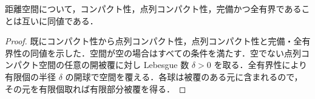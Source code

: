 \begin{prop}[距離空間のコンパクト性の特徴づけ]
距離空間について，コンパクト性，点列コンパクト性，完備かつ全有界であることは互いに同値である．
\end{prop}
\begin{proof}
既にコンパクト性から点列コンパクト性，点列コンパクト性と完備・全有界性の同値を示した．空間が空の場合はすべての条件を満たす．空でない点列コンパクト空間の任意の開被覆に対し Lebesgue 数 $\delta>0$ を取る．全有界性により有限個の半径 $\delta$ の開球で空間を覆える．各球は被覆のある元に含まれるので，その元を有限個取れば有限部分被覆を得る．
\end{proof}
